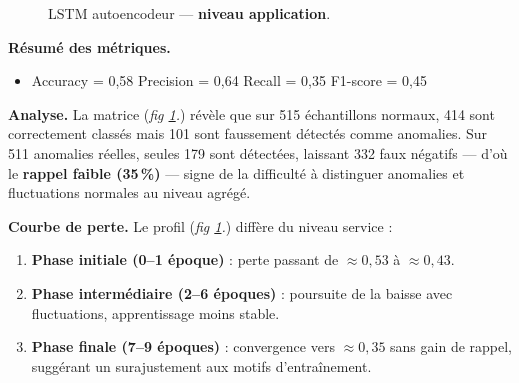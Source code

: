 \documentclass[conference]{IEEEtran}
\begin{document}
\begin{figure}[!t]
  \centering
  \hfill%
  \caption{LSTM autoencodeur — \textbf{niveau application}.}
  \label{fig:lstm-app}
\end{figure}

\textbf{Résumé des métriques.}
\begin{itemize}
    \item Accuracy = 0{,}58 \quad
          Precision = 0{,}64 \quad
          Recall = 0{,}35 \quad
          F1-score = 0{,}45
\end{itemize}

\textbf{Analyse.}
La matrice (\textit{fig \ref{fig:lstm-app}.}) révèle que sur 515 échantillons normaux, 414 sont correctement classés mais 101 sont faussement détectés comme anomalies.  
Sur 511 anomalies réelles, seules 179 sont détectées, laissant 332 faux négatifs — d’où le \textbf{rappel faible (35\,\%)} — signe de la difficulté à distinguer anomalies et fluctuations normales au niveau agrégé.

\textbf{Courbe de perte.}
Le profil (\textit{fig \ref{fig:lstm-app}.}) diffère du niveau service :
\begin{enumerate}
    \item \textbf{Phase initiale (0--1 époque)} : perte passant de $\approx 0{,}53$ à $\approx 0{,}43$.
    \item \textbf{Phase intermédiaire (2--6 époques)} : poursuite de la baisse avec fluctuations, apprentissage moins stable.
    \item \textbf{Phase finale (7--9 époques)} : convergence vers $\approx 0{,}35$ sans gain de rappel, suggérant un surajustement aux motifs d’entraînement.
\end{enumerate}
\end{document}
